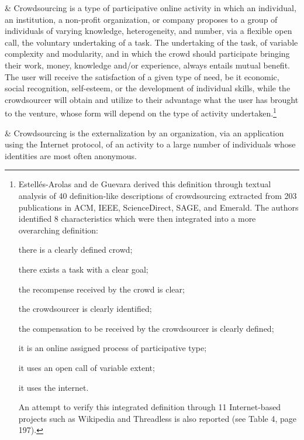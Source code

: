 \documentclass[letterpaper,10pt,pagesize=pdftex,headings=normal]{scrreprt}
\begin{document}
\begin{longtabu}
\citet{arolas2012} & Crowdsourcing is a type of participative online activity in which an individual, an institution, a non-profit organization, or company proposes to a group of individuals of varying knowledge, heterogeneity, and number, via a flexible open call, the voluntary undertaking of a task. The undertaking of the task, of variable complexity and modularity, and in which the crowd should participate bringing their work, money, knowledge and/or experience, always entails mutual benefit. The user will receive the satisfaction of a given type of need, be it economic, social recognition, self-esteem, or the development of individual skills, while the crowdsourcer will obtain and utilize to their advantage what the user has brought to the venture, whose form will depend on the type of activity undertaken.\footnote{Estellés-Arolas and de Guevara derived this definition through textual analysis of 40 definition-like descriptions of crowdsourcing extracted from 203 publications in ACM, IEEE, ScienceDirect, SAGE, and Emerald. The authors identified 8 characteristics which were then integrated into a more overarching definition:
\begin{enumerate*}[label=\alph*\upshape)]
\item there is a clearly defined crowd;
\item there exists a task with a clear goal;
\item the recompense received by the crowd is clear;
\item the crowdsourcer is clearly identified;
\item the compensation to be received by the crowdsourcer is clearly defined;
\item it is an online assigned process of participative type;
\item it uses an open call of variable extent;
\item it uses the internet.
\end{enumerate*}
An attempt to verify this integrated definition through 11 Internet-based projects such as Wikipedia and Threadless is also reported (see Table 4, page 197). 
} \\

\midrule

\citet{lebraty2013} & Crowdsourcing is the externalization by an organization, via an application using the Internet protocol, of an activity to a large number of individuals whose identities are most often anonymous. \\ 


\end{longtabu}
\end{document}
